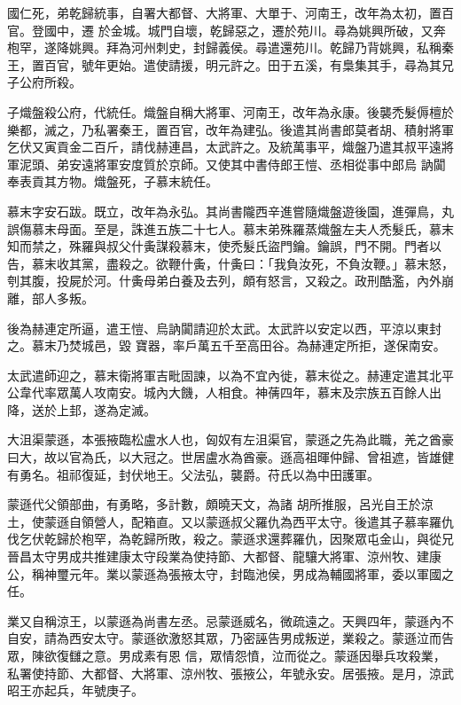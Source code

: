\begin{pinyinscope}
 國仁死，弟乾歸統事，自署大都督、大將軍、大單于、河南王，改年為太初，置百官。登國中，遷
 於金城。城門自壞，乾歸惡之，遷於苑川。尋為姚興所破，又奔枹罕，遂降姚興。拜為河州刺史，封歸義侯。尋遣還苑川。乾歸乃背姚興，私稱秦王，置百官，號年更始。遣使請援，明元許之。田于五溪，有梟集其手，尋為其兄子公府所殺。



 子熾盤殺公府，代統任。熾盤自稱大將軍、河南王，改年為永康。後襲禿髮傉檀於樂都，滅之，乃私署秦王，置百官，改年為建弘。後遣其尚書郎莫者胡、積射將軍乞伏又寅貢金二百斤，請伐赫連昌，太武許之。及統萬事平，熾盤乃遣其叔平遠將軍泥頭、弟安遠將軍安度質於京師。又使其中書侍郎王愷、丞相從事中郎烏
 訥闐奉表貢其方物。熾盤死，子慕末統任。



 慕末字安石跋。既立，改年為永弘。其尚書隴西辛進嘗隨熾盤遊後園，進彈鳥，丸誤傷慕末母面。至是，誅進五族二十七人。慕末弟殊羅蒸熾盤左夫人禿髮氏，慕末知而禁之，殊羅與叔父什夤謀殺慕末，使禿髮氏盜門鑰。鑰誤，門不開。門者以告，慕末收其黨，盡殺之。欲鞭什夤，什夤曰：「我負汝死，不負汝鞭。」慕末怒，刳其腹，投屍於河。什夤母弟白養及去列，頗有怒言，又殺之。政刑酷濫，內外崩離，部人多叛。



 後為赫連定所逼，遣王愷、烏訥闐請迎於太武。太武許以安定以西，平涼以東封之。慕末乃焚城邑，毀
 寶器，率戶萬五千至高田谷。為赫連定所拒，遂保南安。



 太武遣師迎之，慕末衛將軍吉毗固諫，以為不宜內徙，慕末從之。赫連定遣其北平公韋代率眾萬人攻南安。城內大饑，人相食。神蒨四年，慕末及宗族五百餘人出降，送於上邽，遂為定滅。



 大沮渠蒙遜，本張掖臨松盧水人也，匈奴有左沮渠官，蒙遜之先為此職，羌之酋豪曰大，故以官為氏，以大冠之。世居盧水為酋豪。遜高祖暉仲歸、曾祖遮，皆雄健有勇名。祖祁復延，封伏地王。父法弘，襲爵。苻氏以為中田護軍。



 蒙遜代父領部曲，有勇略，多計數，頗曉天文，為諸
 胡所推服，呂光自王於涼土，使蒙遜自領營人，配箱直。又以蒙遜叔父羅仇為西平太守。後遣其子慕率羅仇伐乞伏乾歸於枹罕，為乾歸所敗，殺之。蒙遜求還葬羅仇，因聚眾屯金山，與從兄晉昌太守男成共推建康太守段業為使持節、大都督、龍驤大將軍、涼州牧、建康公，稱神璽元年。業以蒙遜為張掖太守，封臨池侯，男成為輔國將軍，委以軍國之任。



 業又自稱涼王，以蒙遜為尚書左丞。忌蒙遜威名，微疏遠之。天興四年，蒙遜內不自安，請為西安太守。蒙遜欲激怒其眾，乃密誣告男成叛逆，業殺之。蒙遜泣而告眾，陳欲復讎之意。男成素有恩
 信，眾情怨憤，泣而從之。蒙遜因舉兵攻殺業，私署使持節、大都督、大將軍、涼州牧、張掖公，年號永安。居張掖。是月，涼武昭王亦起兵，年號庚子。




\end{pinyinscope}
